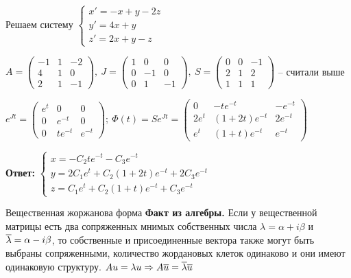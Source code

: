 \documentclass[12pt]{article}
\begin{document}
\begin{Example}{}
    Решаем систему $\begin{cases}
        x' = -x + y - 2z \\
        y' = 4x + y \\
        z' = 2x + y - z 
    \end{cases}$

    $A = \begin{pmatrix}
        -1 & 1 & -2 \\
        4 & 1 & 0 \\
        2 & 1 & -1
    \end{pmatrix},\ J = \begin{pmatrix}
        1 & 0 & 0 \\
        0 & -1 & 0 \\
        0 & 1 & -1
    \end{pmatrix},\ S = \begin{pmatrix}
        0 & 0 & -1 \\
        2 & 1 & 2 \\
        1 & 1 & 1
    \end{pmatrix}$ -- считали выше 

    $e^{Jt} = \begin{pmatrix}
        e^t & 0 & 0 \\
        0 & e^{-t} & 0 \\
        0 & te^{-t} & e^{-t}
    \end{pmatrix};\ \Phi(t) = Se^{Jt} = \begin{pmatrix}
        0 & -te^{-t} & -e^{-t} \\
        2e^t & (1 + 2t)e^{-t} & 2e^{-t} \\
        e^t & (1 + t)e^{-t} & e^{-t}
    \end{pmatrix}$

    \textbf{Ответ:} $\begin{cases}
        x = -C_2te^{-t} - C_3e^{-t} \\
        y = 2C_1e^t + C_2(1 + 2t)e^{-t} + 2C_3e^{-t} \\
        z = C_1e^t + C_2(1 + t)e^{-t} + C_3e^{-t}
    \end{cases}$
\end{Example}

\begin{defin}{Вещественная жоржанова форма}
    \textbf{Факт из алгебры.} Если у вещественной матрицы есть два сопряженных мнимых собственных числа $\lambda = \alpha + i\beta$ и $\overline{\lambda} = \alpha - i\beta$, то собственные и присоединенные вектора также могут быть выбраны сопряженными, количество жордановых клеток одинаково и они имеют одинаковую структуру. $Au = \lambda u \Rightarrow A\overline{u} = \overline{\lambda}\overline{u}$
\end{defin}
\end{document}
